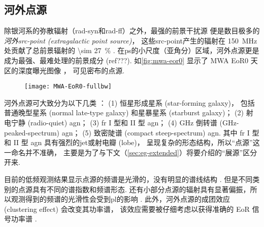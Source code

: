 \subsection{河外点源}

除银河系的弥散辐射（\ac{rad-syn}和\ac{rad-ff}）之外，最强的前景干扰源
便是数目极多的\emph{河外\acs{src-point} (extragalactic point source)}，
这些\ac{src-point}产生的辐射在 \SI{150}{\MHz} 处贡献了总前景辐射的
\SI{\sim 27}{\percent} \cite{shaver1999}.
在\ac{ps}的小尺度（亚角分）区域，河外点源更是成为最强、最难处理的前景成分 (ref???).
如\autoref{fig:mwa-eor0} 显示了 MWA EoR0 天区的深度曝光图像 \cite{offringa2016}，
可见密布的点源.

\begin{figure}[tbp]
  \centering
  \texttt{[image: MWA-EoR0-fullbw]}
  \label{fig:mwa-eor0}
\end{figure}

河外点源可大致分为以下几类 \cite{snellen2000,wilman2008,wang2010}：
(1) 恒星形成星系 (star-forming galaxy)，
包括普通晚型星系 (normal late-type galaxy) 和星暴星系 (starburst galaxy)；
(2) 射电宁静 (radio-quiet) \ac{agn}；
(3) \ac{fr} I 型和 II 型 \ac{agn}；
(4) GHz 倒转谱 (GHz-peaked-spectrum) \ac{agn}；
(5) 致密陡谱 (compact steep-spectrum) \ac{agn}.
其中 \ac{fr} I 型和 II 型 \ac{agn} 具有强烈的\ac{jet}或射电瓣 (lobe)，
呈现复杂的形态结构，所以\enquote{点源}这一命名并不准确，
主要是为了与下文（\autoref{sec:eg-extended}）将要介绍的\enquote{展源}区分开来.

目前的低频观测结果显示点源的频谱是光滑的，没有明显的谱线结构 \cite{offringa2016}.
但是不同类别的点源具有不同的谱指数和频谱形态.
还有小部分点源的辐射具有显著偏振，所以观测得到的频谱的光滑性会受到\ac{pl}的影响
\cite{geil2011,vanEck2018}.
此外，河外点源的成团效应 (clustering effect) 会改变其功率谱，
该效应需要被仔细考虑以获得准确的 EoR 信号功率谱
\cite{diMatteo2004,liu2011,murray2017}.

